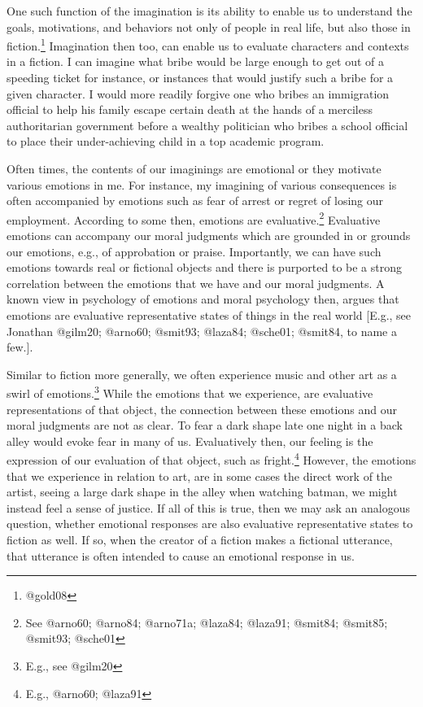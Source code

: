 \documentclass[
  letterpaper,
  DIV=11,
  numbers=noendperiod]{scrartcl}
\theoremstyle{remark}
\begin{document}
One such function of the imagination is its ability to enable us to
understand the goals, motivations, and behaviors not only of people in
real life, but also those in fiction.\footnote{@gold08} Imagination then
too, can enable us to evaluate characters and contexts in a fiction. I
can imagine what bribe would be large enough to get out of a speeding
ticket for instance, or instances that would justify such a bribe for a
given character. I would more readily forgive one who bribes an
immigration official to help his family escape certain death at the
hands of a merciless authoritarian government before a wealthy
politician who bribes a school official to place their under-achieving
child in a top academic program.

Often times, the contents of our imaginings are emotional or they
motivate various emotions in me. For instance, my imagining of various
consequences is often accompanied by emotions such as fear of arrest or
regret of losing our employment. According to some then, emotions are
evaluative.\footnote{See @arno60; @arno84; @arno71a; @laza84; @laza91;
  @smit84; @smit85; @smit93; @sche01} Evaluative emotions can accompany
our moral judgments which are grounded in or grounds our emotions, e.g.,
of approbation or praise. Importantly, we can have such emotions towards
real or fictional objects and there is purported to be a strong
correlation between the emotions that we have and our moral judgments. A
known view in psychology of emotions and moral psychology then, argues
that emotions are evaluative representative states of things in the real
world {[}E.g., see Jonathan @gilm20; @arno60; @smit93; @laza84; @sche01;
@smit84, to name a few.{]}.

Similar to fiction more generally, we often experience music and other
art as a swirl of emotions.\footnote{E.g., see @gilm20} While the
emotions that we experience, are evaluative representations of that
object, the connection between these emotions and our moral judgments
are not as clear. To fear a dark shape late one night in a back alley
would evoke fear in many of us. Evaluatively then, our feeling is the
expression of our evaluation of that object, such as fright.\footnote{E.g.,
  @arno60; @laza91} However, the emotions that we experience in relation
to art, are in some cases the direct work of the artist, seeing a large
dark shape in the alley when watching batman, we might instead feel a
sense of justice. If all of this is true, then we may ask an analogous
question, whether emotional responses are also evaluative representative
states to fiction as well. If so, when the creator of a fiction makes a
fictional utterance, that utterance is often intended to cause an
emotional response in us.
\end{document}
